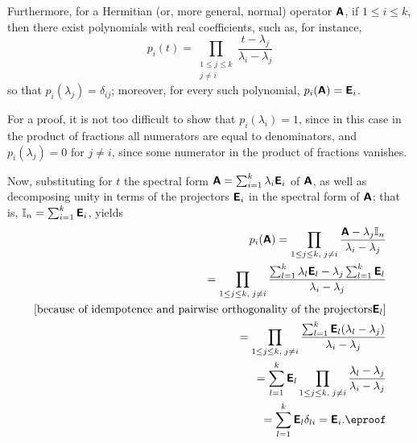 Furthermore, for a  Hermitian (or, more general, normal) operator $\textsf{\textbf{A}}$,
if $1\le i \le k$,
then there exist polynomials with real coefficients, such as,  for instance,
\begin{equation}
p_i  (t)
=
\prod_{
\begin{array}{c}
1\le j\le k\\
j\neq i
\end{array}
}
\frac{t-\lambda_j}{\lambda_i -\lambda_j}
\label{2011-m-epsf}
\end{equation}
so that
$p_i(\lambda_j) =\delta_{ij}$;
moreover, for every such polynomial,
$p_i(\textsf{\textbf{A}})=\textsf{\textbf{E}}_i$.

{\color{OliveGreen}\bproof

For a proof, it is not too difficult
to show that
$p_i  (\lambda_i)=1$, since in this case in the product of fractions all numerators are equal to denominators,
and
$p_i  (\lambda_j)=0$ for $j\neq i $, since some numerator in the product of fractions vanishes.

Now, substituting for $t$ the spectral form $\textsf{\textbf{A}}=\sum_{i=1}^k \lambda_i\textsf{\textbf{E}}_i$
of $\textsf{\textbf{A}}$, as well as
decomposing unity in terms of the projectors $\textsf{\textbf{E}}_i$ in the spectral form of
$\textsf{\textbf{A}}$; that is, ${\Bbb I}_n=\sum_{i=1}^k \textsf{\textbf{E}}_i$,
yields
\begin{equation}
\begin{split}
p_i  (\textsf{\textbf{A}})
=
\prod_{
1\le j\le k,\;
j\neq i
}\frac{\textsf{\textbf{A}} - \lambda_j{\Bbb I}_n}{\lambda_i -\lambda_j}  \\
=
\prod_{
1\le j\le k,\;
j\neq i
}\frac{\sum_{l=1}^k \lambda_l\textsf{\textbf{E}}_l - \lambda_j\sum_{l=1}^k \textsf{\textbf{E}}_l}{\lambda_i -\lambda_j}  \\
\text{[because of idempotence and pairwise orthogonality of the projectors}  \textsf{\textbf{E}}_l  \text{]}    \\
=
\prod_{
1\le j\le k,\;
j\neq i
}\frac{\sum_{l=1}^k \textsf{\textbf{E}}_l(\lambda_l- \lambda_j)}{\lambda_i -\lambda_j}  \\
= \sum_{l=1}^k \textsf{\textbf{E}}_l
\prod_{
1\le j\le k,\;
j\neq i
}\frac{\lambda_l- \lambda_j}{\lambda_i -\lambda_j}  \\
= \sum_{l=1}^k \textsf{\textbf{E}}_l
\delta_{li} = \textsf{\textbf{E}}_i.
\eproof
\end{split}
\label{2012-m-ch-fdvs-cc}
\end{equation}
}

